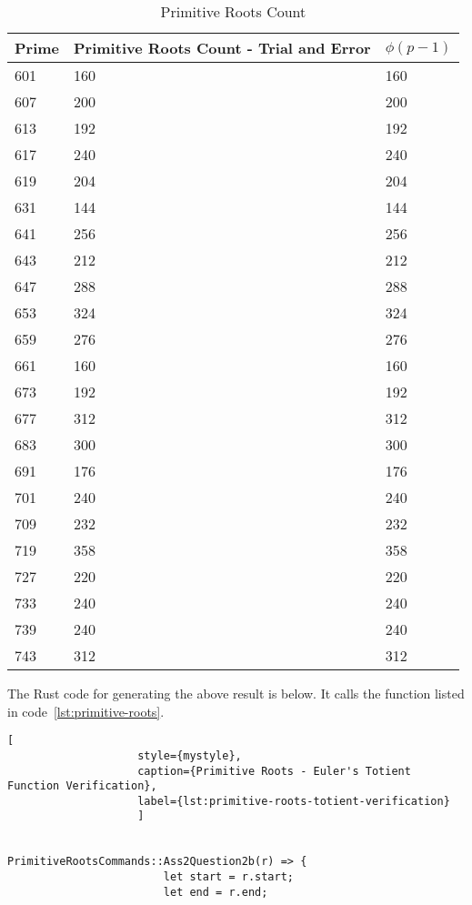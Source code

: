 \documentclass[11pt,a4paper,fleqn]{article}
\begin{document}
\begin{enumerate}[1.]
\begin{enumerate}[a.]
\begin{flushleft}
				\begin{table}[!ht]
					\centering
					\begin{tabular}{|l|l|l|}
						\hline
						Prime & Primitive Roots Count - Trial and Error & $\phi(p-1)$ \\ \hline
						601 & 160 & 160 \\ \hline
						607 & 200 & 200 \\ \hline
						613 & 192 & 192 \\ \hline
						617 & 240 & 240 \\ \hline
						619 & 204 & 204 \\ \hline
						631 & 144 & 144 \\ \hline
						641 & 256 & 256 \\ \hline
						643 & 212 & 212 \\ \hline
						647 & 288 & 288 \\ \hline
						653 & 324 & 324 \\ \hline
						659 & 276 & 276 \\ \hline
						661 & 160 & 160 \\ \hline
						673 & 192 & 192 \\ \hline
						677 & 312 & 312 \\ \hline
						683 & 300 & 300 \\ \hline
						691 & 176 & 176 \\ \hline
						701 & 240 & 240 \\ \hline
						709 & 232 & 232 \\ \hline
						719 & 358 & 358 \\ \hline
						727 & 220 & 220 \\ \hline
						733 & 240 & 240 \\ \hline
						739 & 240 & 240 \\ \hline
						743 & 312 & 312 \\ \hline
					\end{tabular}
					\caption{Primitive Roots Count}
					\label{table:primitive_roots_count}
				\end{table}

				The Rust code for generating the above result is below. It calls the function listed in code~\ref{lst:primitive-roots}.
				\begin{lstlisting}[
					style={mystyle},
					caption={Primitive Roots - Euler's Totient Function Verification},
					label={lst:primitive-roots-totient-verification}
					]

					            PrimitiveRootsCommands::Ass2Question2b(r) => {
						let start = r.start;
						let end = r.end;


\end{lstlisting}
\end{flushleft}
\end{enumerate}
\end{enumerate}
\end{document}
